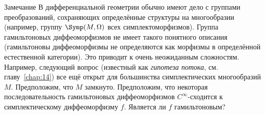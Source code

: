 \begin{ex}{Замечание}\label{1.4.F}
В дифференциальной геометрии обычно имеют дело с группами преобразований, сохраняющих определённые структуры на многообразии (например, группу $\Symp(M,\Omega)$ всех симплектоморфизмов).
Группа гамильтоновых диффеоморфизмов не имеет такого понятного описания (гамильтоновы диффеоморфизмы не определяются как морфизмы в определённой естественной категории).
Это приводит к очень неожиданным сложностям.
Например, следующий вопрос (известный как \emph{гипотеза потока}, см. главу~\ref{chap:14}) все ещё открыт для большинства симплектических многообразий $M$.
Предположим, что $M$ замкнуто.
Предположим, что некоторая последовательность гамильтоновых диффеоморфизмов $C^\infty$-сходится к симплектическому диффеоморфизму $f$.
Является ли $f$ гамильтоновым?
\end{ex}

